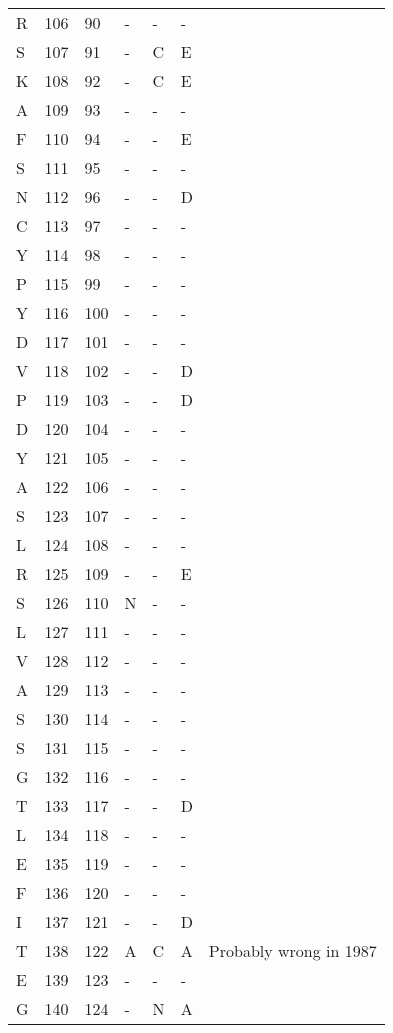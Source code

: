 \documentclass[10pt]{article}
\begin{document}
\begin{longtable}{lllllll}
  R & 106 & 90 & - & - & - &  \\ 
  S & 107 & 91 & - & C & E &  \\ 
  K & 108 & 92 & - & C & E &  \\ 
  A & 109 & 93 & - & - & - &  \\ 
  F & 110 & 94 & - & - & E &  \\ 
  S & 111 & 95 & - & - & - &  \\ 
  N & 112 & 96 & - & - & D &  \\ 
  C & 113 & 97 & - & - & - &  \\ 
  Y & 114 & 98 & - & - & - &  \\ 
  P & 115 & 99 & - & - & - &  \\ 
  Y & 116 & 100 & - & - & - &  \\ 
  D & 117 & 101 & - & - & - &  \\ 
  V & 118 & 102 & - & - & D &  \\ 
  P & 119 & 103 & - & - & D &  \\ 
  D & 120 & 104 & - & - & - &  \\ 
  Y & 121 & 105 & - & - & - &  \\ 
  A & 122 & 106 & - & - & - &  \\ 
  S & 123 & 107 & - & - & - &  \\ 
  L & 124 & 108 & - & - & - &  \\ 
  R & 125 & 109 & - & - & E &  \\ 
  S & 126 & 110 & N & - & - &  \\ 
  L & 127 & 111 & - & - & - &  \\ 
  V & 128 & 112 & - & - & - &  \\ 
  A & 129 & 113 & - & - & - &  \\ 
  S & 130 & 114 & - & - & - &  \\ 
  S & 131 & 115 & - & - & - &  \\ 
  G & 132 & 116 & - & - & - &  \\ 
  T & 133 & 117 & - & - & D &  \\ 
  L & 134 & 118 & - & - & - &  \\ 
  E & 135 & 119 & - & - & - &  \\ 
  F & 136 & 120 & - & - & - &  \\ 
  I & 137 & 121 & - & - & D &  \\ 
  T & 138 & 122 & A & C & A & Probably wrong in 1987 \\ 
  E & 139 & 123 & - & - & - &  \\ 
  G & 140 & 124 & - & N & A &  \\ 

\end{longtable}
\end{document}
